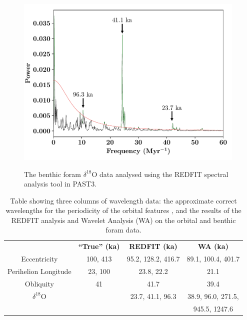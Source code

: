 \documentclass[12pt, onecolumn]{revtex4}    %
\begin{document}
\begin{figure}[!h]
\begin{center}
\includegraphics[width=11cm]{figures/d18O_redfit}
\caption[]{The benthic foram $\delta^{18}$O data analysed using the REDFIT spectral analysis tool in PAST3.}
\vspace{-3ex}
\label{fig:d18o_redfit}
\end{center}
\end{figure}

\begin{table}[h!]
\centering
\begin{tabular}{c@{\hskip 20pt}c@{\hskip 20pt}c@{\hskip 20pt}c} 
 \hline
  & \textbf{``True'' (ka)} &\textbf{REDFIT (ka)} & \textbf{WA (ka)} \\ [0.5ex] 
 Eccentricity & 100, 413 & 95.2, 128.2, 416.7 & 89.1, 100.4,  401.7\\
 Perihelion Longitude & 23, 100 & 23.8, 22.2 & 21.1 \\
 Obliquity & 41 & 41.7 & 39.4 \\
 $\delta^{18}$O & & 23.7, 41.1, 96.3  & 38.9, 96.0, 271.5, \\
 & & & 945.5, 1247.6 \\
 \hline
\end{tabular}
\caption{Table showing three columns of wavelength data: the approximate correct wavelengths for the periodicity of the orbital features \cite{campisano_milankovitch}, and the results of the REDFIT analysis and Wavelet Analysis (WA) on the orbital and benthic foram data.}
\vspace{-0.5em}
\label{table:final_results}
\end{table}
\end{document}
